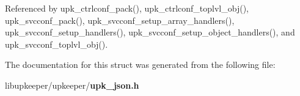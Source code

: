 Referenced by upk\_\-ctrlconf\_\-pack(), upk\_\-ctrlconf\_\-toplvl\_\-obj(), upk\_\-svcconf\_\-pack(), upk\_\-svcconf\_\-setup\_\-array\_\-handlers(), upk\_\-svcconf\_\-setup\_\-handlers(), upk\_\-svcconf\_\-setup\_\-object\_\-handlers(), and upk\_\-svcconf\_\-toplvl\_\-obj().



The documentation for this struct was generated from the following file:\begin{DoxyCompactItemize}
\item 
libupkeeper/upkeeper/{\bf upk\_\-json.h}\end{DoxyCompactItemize}
